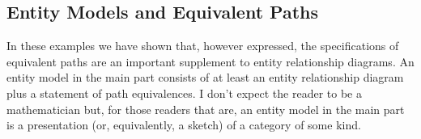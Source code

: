 \subsection{Entity Models and Equivalent Paths}
\mynote
In these examples we have shown that, however expressed,  the specifications of equivalent paths are
an important supplement to entity relationship diagrams. 
An entity model in the main part consists of at least an entity relationship diagram  
plus a statement of path equivalences.
\mynote
I don't expect the reader to be a mathematician but, for those readers that are, an entity model in the main part is a presentation 
(or, equivalently, a sketch) of a category of some kind. 